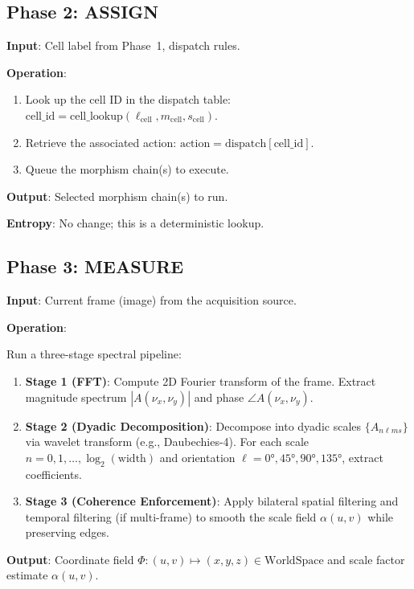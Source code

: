 \documentclass[11pt,twocolumn]{article}
\begin{document}
\subsection{Phase 2: ASSIGN}

\textbf{Input}: Cell label from Phase~1, dispatch rules.

\textbf{Operation}:
\begin{enumerate}
\item Look up the cell ID in the dispatch table: $\text{cell\_id} = \text{cell\_lookup}(\ell_{\text{cell}}, m_{\text{cell}}, s_{\text{cell}})$.
\item Retrieve the associated action: $\text{action} = \text{dispatch}[\text{cell\_id}]$.
\item Queue the morphism chain(s) to execute.
\end{enumerate}

\textbf{Output}: Selected morphism chain(s) to run.

\textbf{Entropy}: No change; this is a deterministic lookup.

\subsection{Phase 3: MEASURE}

\textbf{Input}: Current frame (image) from the acquisition source.

\textbf{Operation}:

Run a three-stage spectral pipeline:

\begin{enumerate}
\item \textbf{Stage 1 (FFT)}: Compute 2D Fourier transform of the frame. Extract magnitude spectrum $|A(\nu_x, \nu_y)|$ and phase $\angle A(\nu_x, \nu_y)$.
\item \textbf{Stage 2 (Dyadic Decomposition)}: Decompose into dyadic scales $\{A_{n\ell m s}\}$ via wavelet transform (e.g., Daubechies-4). For each scale $n = 0, 1, \ldots, \log_2(\text{width})$ and orientation $\ell = 0°, 45°, 90°, 135°$, extract coefficients.
\item \textbf{Stage 3 (Coherence Enforcement)}: Apply bilateral spatial filtering and temporal filtering (if multi-frame) to smooth the scale field $\alpha(u, v)$ while preserving edges.
\end{enumerate}

\textbf{Output}: Coordinate field $\Phi : (u, v) \mapsto (x, y, z) \in \text{WorldSpace}$ and scale factor estimate $\alpha(u, v)$.
\end{document}
